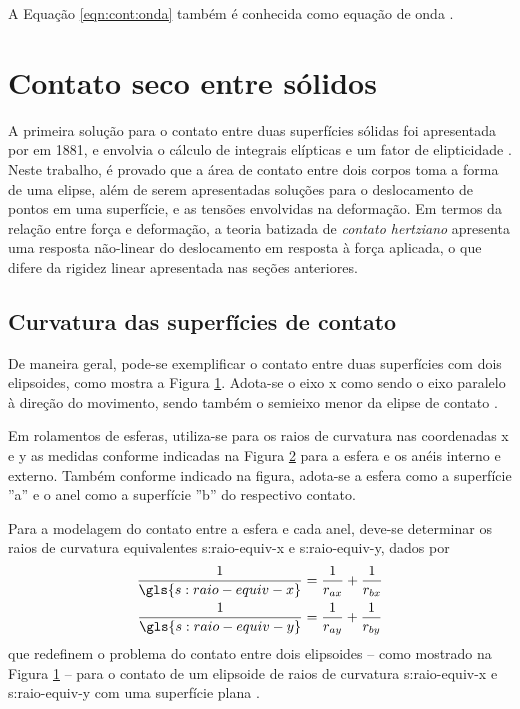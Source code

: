 \documentclass[12pt,oneside,english,brazil,lmodern,siglas,simbolos,cite=num]{ucsmonograph}
\begin{document}
	A Equação \ref{eqn:cont:onda} também é conhecida como equação de onda \cite{rao:2008}. 
	
	\section{Contato seco entre sólidos} \label{sec:contato-seco}
	A primeira solução para o contato entre duas superfícies sólidas foi apresentada por  em 1881, e envolvia o cálculo de integrais elípticas e um fator de elipticidade \cite{hertz:1881}.
	Neste trabalho, é provado que a área de contato entre dois corpos toma a forma de uma elipse, além de serem apresentadas soluções para o deslocamento de pontos em uma superfície, e as tensões envolvidas na deformação.
	Em termos da relação entre força e deformação, a teoria batizada de \emph{contato hertziano} apresenta uma resposta não-linear do deslocamento em resposta à força aplicada, o que difere da rigidez linear apresentada nas seções anteriores.
	
	\subsection{Curvatura das superfícies de contato} \label{sec:curvatura-contato}
	De maneira geral, pode-se exemplificar o contato entre duas superfícies com dois elipsoides, como mostra a Figura \ref{fig:contato-elipses}.
	Adota-se o eixo x como sendo o eixo paralelo à direção do movimento, sendo também o semieixo menor da elipse de contato \cite{hamrock:1991}.
	\begin{figure}[ht]
		\label{fig:contato-elipses}
	\end{figure}

	Em rolamentos de esferas, utiliza-se para os raios de curvatura nas coordenadas x e y as medidas conforme indicadas na Figura \ref{fig:raios-rolamento} para a esfera e os anéis interno e externo.
	Também conforme indicado na figura, adota-se a esfera como a superfície ''a'' e o anel como a superfície ''b'' do respectivo contato.
	\begin{figure}[b]
		\label{fig:raios-rolamento}
	\end{figure}

	Para a modelagem do contato entre a esfera e cada anel, deve-se determinar os raios de curvatura equivalentes \gls{s:raio-equiv-x} e \gls{s:raio-equiv-y}, dados por
	\begin{gather}
		\frac{1}{\gls{s:raio-equiv-x}} = \frac{1}{r_{ax}} +
		\frac{1}{r_{bx}} \label{eqn:seco:r-equiv-x} \\
		\frac{1}{\gls{s:raio-equiv-y}} = \frac{1}{r_{ay}} +
		\frac{1}{r_{by}} \label{eqn:seco:r-equiv-y}
	\end{gather}
	que redefinem o problema do contato entre dois elipsoides -- como mostrado na Figura \ref{fig:contato-elipses} -- para o contato de um elipsoide de raios de curvatura \gls{s:raio-equiv-x} e \gls{s:raio-equiv-y} com uma superfície plana \cite{hamrock:1991}.
	
\end{document}
